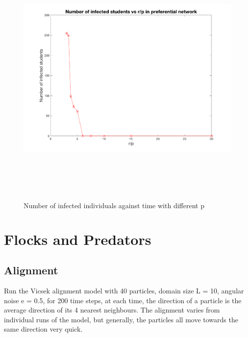 \documentclass[12pt]{article}
\begin{document}
\begin{figure}[H] %
\centering
\includegraphics[width = 16 cm, height = 13cm]{pnwprp.png}
\caption{Number of infected individuals against time with different p}
\label{fig:pnwprp}
\end{figure}




\newpage
\section{Flocks and Predators}
\doublespacing

\subsection{Alignment}

Run the Vicsek alignment model with 40 particles, domain size L = 10, angular noise e = 0.5, for 200 time steps, at each time, the direction of a particle is the average direction of its 4 nearest neighbours. The alignment varies from individual runs of the model, but generally, the particles all move towards the same direction very quick.
\end{document}
